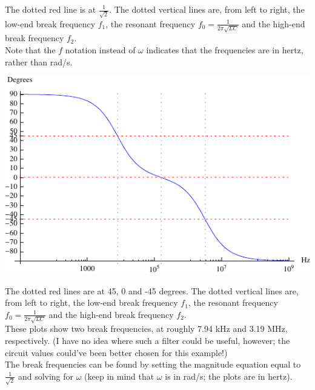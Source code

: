 \documentclass[12pt,a4paper]{report}
\begin{document}
The dotted red line is at $\displaystyle \frac{1}{\sqrt{2}}$. The dotted vertical lines are, from left to right, the low-end break frequency $f_1$, the resonant frequency $\displaystyle f_0 = \frac{1}{2\pi \sqrt{LC}}$ and the high-end break frequency $f_2$.\\
Note that the $f$ notation instead of $\omega$ indicates that the frequencies are in hertz, rather than rad/s.

\includegraphics[scale=1.75]{Graphics/bpf_phase_plot}

The dotted red lines are at 45, 0 and -45 degrees. The dotted vertical lines are, from left to right, the low-end break frequency $f_1$, the resonant frequency $\displaystyle f_0 = \frac{1}{2\pi \sqrt{LC}}$ and the high-end break frequency $f_2$.\\

These plots show two break frequencies, at roughly 7.94 kHz and 3.19 MHz, respectively. (I have no idea where such a filter could be useful, however; the circuit values could've been better chosen for this example!)\\
The break frequencies can be found by setting the magnitude equation equal to $\displaystyle \frac{1}{\sqrt{2}}$ and solving for $\omega$ (keep in mind that $\omega$ is in rad/s; the plots are in hertz).\\
\end{document}
